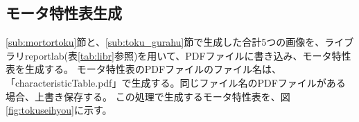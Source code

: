 \subsection{モータ特性表生成}\label{sub:}
\ref{sub:mortortoku}節と、\ref{sub:toku_gurahu}節で生成した合計5つの画像を、ライブラリreportlab(表\ref{tab:libr}参照)を用いて、PDFファイルに書き込み、モータ特性表を生成する。
モータ特性表のPDFファイルのファイル名は、「characteristicTable.pdf」で生成する。同じファイル名のPDFファイルがある場合、上書き保存する。
この処理で生成するモータ特性表を、図\ref{fig:tokuseihyou}に示す。
